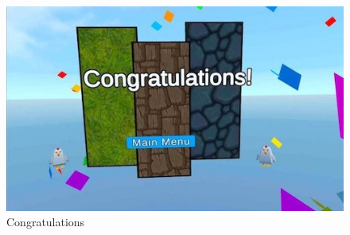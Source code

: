 \documentclass{vgtc}                          %
\begin{document}
\begin{figure}[tb]
  \centering %
  \includegraphics[width=\columnwidth]{cong.jpeg}
  \caption{Congratulations}
 \end{figure}

%

%
%
%


\end{document}
